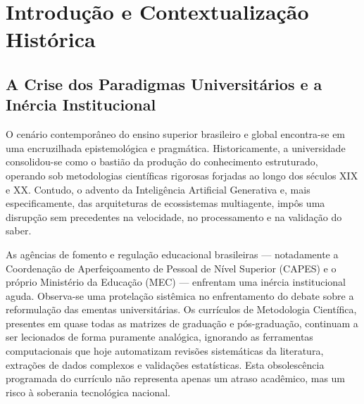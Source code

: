 \documentclass[12pt,a4paper]{article}
\begin{document}
\begin{abstract}
\noindent O presente Projeto Pedagógico de Disciplina (PPD) propõe uma matriz curricular inédita que funde o rigor da Metodologia Científica tradicional com o estado da arte na Arquitetura de Ecossistemas Multiagente (Inteligência Artificial). Fundamentado no Artigo 205 da Constituição Federal, o projeto rompe a falsa dicotomia entre ensino humanístico e ensino mercadológico. Ao longo de 120 horas e 10 laboratórios práticos, o discente é capacitado a transitar dos paradigmas epistemológicos clássicos para a engenharia de \textit{software} aplicada (\textit{Model Context Protocol}, Inversão de Controle, \textit{Self-Healing} e RAG Adaptativo). O trabalho introduz, ainda, protocolos éticos rigorosos (Matriz TSAC) para prevenção de alucinação algorítmica e exige a proposição de estudos de caso para a resolução empírica de problemas em Crateús/CE. O perfil do egresso consolida a formação de um Pesquisador-Arquiteto Híbrido, preparado para a inovação acadêmica e soberania tecnológica.
\vspace{0.5cm}\\
\textbf{Palavras-chave:} Metodologia Científica. Ecossistemas Multiagente. Educação Superior. Inteligência Artificial. Crateús-CE.
\end{abstract}
\newpage

\tableofcontents
\newpage

\section{Introdução e Contextualização Histórica}

\subsection{A Crise dos Paradigmas Universitários e a Inércia Institucional}
O cenário contemporâneo do ensino superior brasileiro e global encontra-se em uma encruzilhada epistemológica e pragmática. Historicamente, a universidade consolidou-se como o bastião da produção do conhecimento estruturado, operando sob metodologias científicas rigorosas forjadas ao longo dos séculos XIX e XX. Contudo, o advento da Inteligência Artificial Generativa e, mais especificamente, das arquiteturas de ecossistemas multiagente, impôs uma disrupção sem precedentes na velocidade, no processamento e na validação do saber. 

As agências de fomento e regulação educacional brasileiras --- notadamente a Coordenação de Aperfeiçoamento de Pessoal de Nível Superior (CAPES) e o próprio Ministério da Educação (MEC) --- enfrentam uma inércia institucional aguda. Observa-se uma protelação sistêmica no enfrentamento do debate sobre a reformulação das ementas universitárias. Os currículos de Metodologia Científica, presentes em quase todas as matrizes de graduação e pós-graduação, continuam a ser lecionados de forma puramente analógica, ignorando as ferramentas computacionais que hoje automatizam revisões sistemáticas da literatura, extrações de dados complexos e validações estatísticas. Esta obsolescência programada do currículo não representa apenas um atraso acadêmico, mas um risco à soberania tecnológica nacional.
\end{document}
